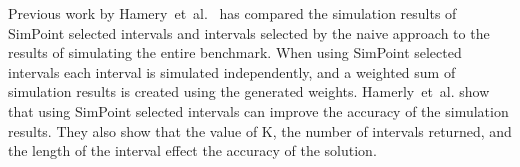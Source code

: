Previous work by Hamery~et~al.~\cite{Hamerly2004} has compared the simulation results of SimPoint selected intervals and intervals selected by the naive approach to the results of simulating the entire benchmark.
When using SimPoint selected intervals each interval is simulated independently, and a weighted sum of simulation results is created using the generated weights.
Hamerly~et~al. show that using SimPoint selected intervals can improve the accuracy of the simulation results. 
They also show that the value of K, the number of intervals returned, and the length of the interval effect the accuracy of the solution. 


